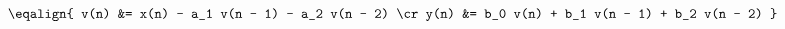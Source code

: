 \hsize 0pt
\vsize 0pt
\nopagenumbers
\overfullrule 0pt
\noindent
$$
\eqalign{
v(n) &= x(n) - a_1 v(n - 1) - a_2 v(n - 2) \cr
y(n) &= b_0 v(n) + b_1 v(n - 1) + b_2 v(n - 2)
}
$$
\bye